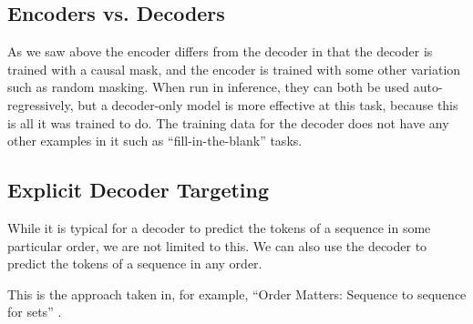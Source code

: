 


\subsection {Encoders vs. Decoders}
\label{ss:enc-vs-dec}

As we saw above the encoder differs from the decoder in that the decoder is trained with a causal mask, and the encoder is trained with some other variation such as random masking. When run in inference, they can both be used auto-regressively, but a decoder-only model is more effective at this task, because this is all it was trained to do. The training data for the decoder does not have any other examples in it such as ``fill-in-the-blank'' tasks.

\subsection{Explicit Decoder Targeting}
\label{ss:pure-query}

While it is typical for a decoder to predict the tokens of a sequence in some particular order, we are not limited to this. We can also use the decoder to predict the tokens of a sequence in any order.

This is the approach taken in, for example, ``Order Matters: Sequence to sequence for sets'' \cite{order-matters}.








